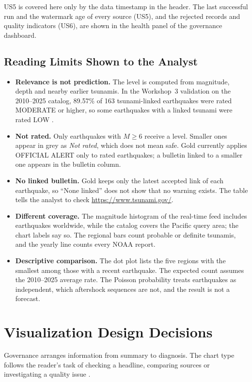 \documentclass[a4paper,11pt,oneside]{book}
\begin{document}
US5 is covered here only by the data timestamp in the header. The last successful run and the watermark age of every source (US5), and the rejected records and quality indicators (US6), are shown in the health panel of the governance dashboard.

\FloatBarrier
\section{Reading Limits Shown to the Analyst}
\begin{itemize}[itemsep=1pt,topsep=3pt,parsep=0pt]
\item \textbf{Relevance is not prediction.} The level is computed from magnitude, depth and nearby earlier tsunamis. In the Workshop~3 validation on the 2010--2025 catalog, 89.57\% of 163 tsunami-linked earthquakes were rated MODERATE or higher, so some earthquakes with a linked tsunami were rated LOW \cite{workshop3}.
\item \textbf{Not rated.} Only earthquakes with $M\geq6$ receive a level. Smaller ones appear in grey as \emph{Not rated}, which does not mean safe. Gold currently applies OFFICIAL ALERT only to rated earthquakes; a bulletin linked to a smaller one appears in the bulletin column.
\item \textbf{No linked bulletin.} Gold keeps only the latest accepted link of each earthquake, so ``None linked'' does not show that no warning exists. The table tells the analyst to check \url{https://www.tsunami.gov/}.
\item \textbf{Different coverage.} The magnitude histogram of the real-time feed includes earthquakes worldwide, while the catalog covers the Pacific query area; the chart labels say so. The regional bars count probable or definite tsunamis, and the yearly line counts every NOAA report.
\item \textbf{Descriptive comparison.} The dot plot lists the five regions with the smallest  among those with a recent earthquake. The expected count assumes the 2010--2025 average rate. The Poisson probability treats earthquakes as independent, which aftershock sequences are not, and the result is not a forecast.
\end{itemize}

\chapter{Visualization Design Decisions}
\label{ch:design}
Governance arranges information from summary to diagnosis. The chart type follows the reader's task of checking a headline, comparing sources or investigating a quality issue \cite{edaguide}.
\end{document}
